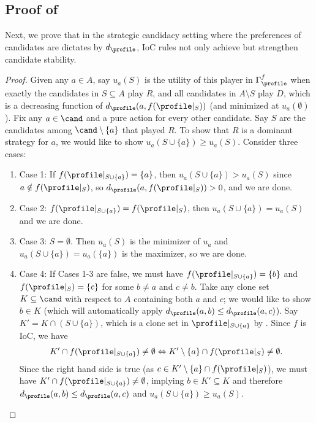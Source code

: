 \subsection{Proof of }
Next, we prove that in the strategic candidacy setting where the preferences of candidates are dictates by $d_{\profile}$, IoC rules not only achieve but strengthen candidate stability.
\iocds*

\begin{proof}
Given any $a\in A$, say $u_a(S)$ is the utility of this player in $\Gamma_{\profile}^f$ when exactly the candidates in $S\subseteq A$ play $R$, and all candidates in $A \setminus S$ play $D$, which is a decreasing function of $d_{\profile}(a,f(\profile|_S))$ (and minimized at $u_a(\emptyset)$). Fix any $a \in \cand$ and a pure action for every other candidate. Say $S$ are the candidates among $\cand \setminus \{a\}$ that played $R$. To show that $R$ is a dominant strategy for $a$, we would like to show $u_a(S\cup\{a\}) \geq u_a(S)$. Consider three cases:
\begin{enumerate}
    \item Case 1: If $f(\profile|_{S \cup \{a\}})=\{a\}$, then $u_a(S \cup \{a\})>u_a(S)$ since $a \notin f(\profile|_{S})$, so $d_{\profile}(a,  f(\profile|_{S}))>0$, and we are done.
    \item Case 2: $f(\profile|_{S \cup \{a\}})=f(\profile|_{S})$, then $u_a(S \cup \{a\})=u_a(S)$ and we are done.
    \item Case 3: $S= \emptyset$. Then $u_a(S)$ is the minimizer of $u_a$ and $u_a(S \cup \{a\})=u_a(\{a\})$ is the maximizer, so we are done. 
    \item Case 4: If Cases 1-3 are false, we must have $f(\profile|_{S \cup \{a\}})=\{b\}$ and $f(\profile|_{S})=\{c\}$ for some $b \neq a$ and $c \neq b$. Take any clone set $K \subseteq \cand$ with respect to $A$ containing both $a$ and $c$; we would like to show $b \in K$ (which will automatically apply $d_{\profile}(a,b) \leq d_{\profile}(a,c)$). Say $K' = K \cap (S \cup \{a\})$, which is a clone set in $\profile|_{S \cup \{a\}}$ by . Since $f$ is IoC, we have
    \begin{align*}
        K' \cap f(\profile|_{S \cup \{a\}}) \neq \emptyset \Leftrightarrow K'\setminus\{a\} \cap f(\profile|_{S}) \neq \emptyset.
    \end{align*}
    Since the right hand side is true (as $c \in K'\setminus\{a\} \cap f(\profile|_{S})$), we must have $ K'\cap f(\profile|_{S \cup \{a\}}) \neq \emptyset$, implying $b \in K' \subseteq K$ and therefore $d_{\profile}(a,b) \leq d_{\profile}(a,c)$ and $u_a(S\cup\{a\}) \geq u_a(S)$.
\end{enumerate} 
\end{proof}


